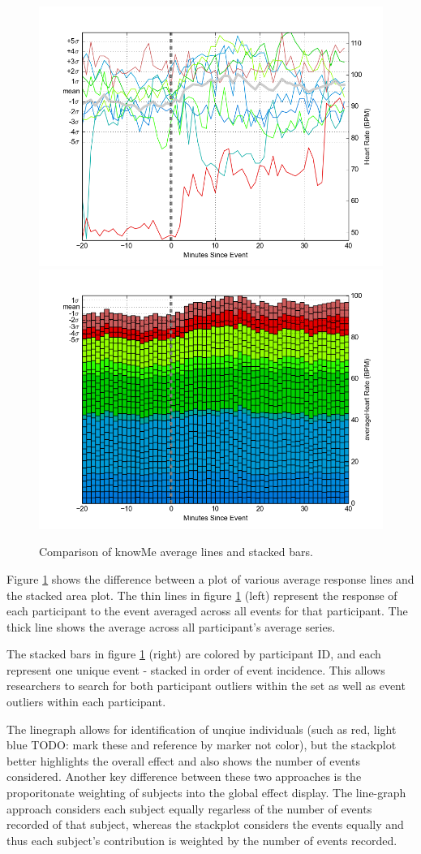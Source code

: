 \documentclass[review,journal]{vgtc}         %
\begin{document}
\begin{figure}
\centering
\includegraphics[width=0.45\columnwidth]{./img/knowMe_60m_lines.png}
\includegraphics[width=0.45\columnwidth]{./img/knowMe_60m_bars.png}
\caption{Comparison of knowMe average lines and stacked bars.}
\label{fig:knowMeCompare}
\end{figure}

Figure \ref{fig:knowMeCompare} shows the difference between a plot of various average response lines and the stacked area plot.
The thin lines in figure \ref{fig:knowMeCompare} (left) represent the response of each participant to the event averaged across all events for that participant.
The thick line shows the average across all participant’s average series.

The stacked bars in figure \ref{fig:knowMeCompare} (right) are colored by participant ID, and each represent one unique event - stacked in order of event incidence.
This allows researchers to search for both participant outliers within the set as well as event outliers within each participant.

The linegraph allows for identification of unqiue individuals (such as red, light blue TODO: mark these and reference by marker not color), but the stackplot better highlights the overall effect and also shows the number of events considered.
Another key difference between these two approaches is the proporitonate weighting of subjects into the global effect display.
The line-graph approach considers each subject equally regarless of the number of events recorded of that subject, whereas the stackplot considers the events equally and thus each subject's contribution is weighted by the number of events recorded.
\end{document}
